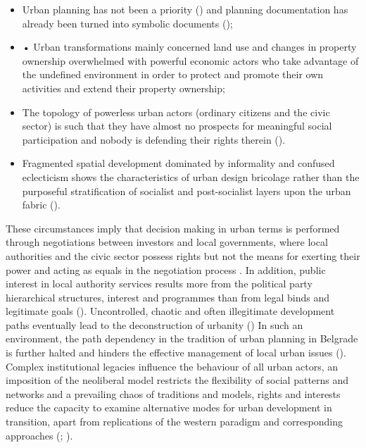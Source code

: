 \documentclass[11pt]{report}
\begin{document}
\begin{itemize}
\item Urban planning has not been a priority (\href{Sykora}{\citealt{sykora_transitional_1999}}) and planning documentation has already been turned into symbolic documents (\href{Nedovic}{\citealt{nedovic-budic_adjustment_2001}});

\item •	Urban transformations mainly concerned land use and changes in property ownership overwhelmed with powerful economic actors who take advantage of the undefined environment in order to protect and promote their own activities and extend their property ownership;
 
\item The topology of powerless urban actors (ordinary citizens and the civic sector) is such that they have almost no prospects for meaningful social participation and nobody is defending their rights therein (\href{Vujovic}{\citealt{vujovic_belgrades_2007}}).

\item Fragmented spatial development dominated by informality and confused eclecticism shows the characteristics of urban design bricolage rather than the purposeful stratification of socialist and post-socialist layers upon the urban fabric (\href{Hirt}{\citealt{hirt_belgrade_2009}}). 
\end{itemize}

These circumstances imply that decision making in urban terms is performed through negotiations between investors and local governments, where local authorities and the civic sector possess rights but not the means for exerting their power and acting as equals in the negotiation process  \href{Bajec}{\citealt{bajec_rational_2009}}.
In addition, public interest in local authority services results more from the political party hierarchical structures, interest and programmes than from legal binds and legitimate goals (\href{Djokic}{\citealt{djokic_political_2007}}).
Uncontrolled, chaotic and often illegitimate development paths eventually lead to the deconstruction of urbanity (\href{Vujosevic}{\citealt{vujovic_belgrades_2007}})
In such an environment, the path dependency in the tradition of urban planning in Belgrade is further halted and hinders the effective management of local urban issues (\href{Nedovic}{\citealt{nedovic-budic_adjustment_2001}}).
Complex institutional legacies influence the behaviour of all urban actors, an imposition of the neoliberal model restricts the flexibility of social patterns and networks and a prevailing chaos of traditions and models, rights and interests reduce the capacity to examine alternative modes for urban development in transition, apart from replications of the western paradigm and corresponding approaches  
(\href{Tsenkova}{\citealt{tsenkova_urban_2007}}; \href{Petrovic}{\citealt{petrovic_cities_2009}}).
   
\end{document}
